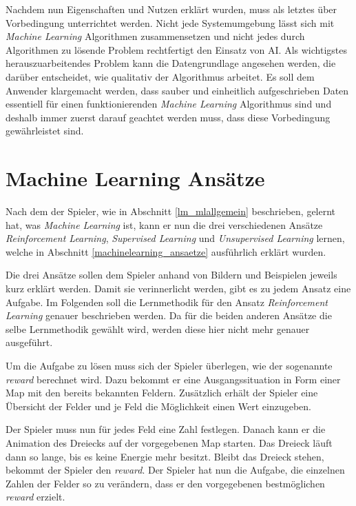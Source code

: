 Nachdem nun Eigenschaften und Nutzen erklärt wurden, muss als letztes über Vorbedingung unterrichtet werden. Nicht jede Systemumgebung lässt sich mit \textit{Machine Learning} Algorithmen zusammensetzen und nicht jedes durch Algorithmen zu lösende Problem rechtfertigt den Einsatz von AI. Als wichtigstes herauszuarbeitendes Problem kann die Datengrundlage angesehen werden, die darüber entscheidet, wie qualitativ der Algorithmus arbeitet. Es soll dem Anwender klargemacht werden, dass sauber und einheitlich aufgeschrieben Daten essentiell für einen funktionierenden \textit{Machine Learning} Algorithmus sind und deshalb immer zuerst darauf geachtet werden muss, dass diese Vorbedingung gewährleistet sind.

\section{Machine Learning Ansätze}
\label{lm_mlansaetze}
Nach dem der Spieler, wie in Abschnitt \ref{lm_mlallgemein} beschrieben, gelernt hat, was \textit{Machine Learning} ist, kann er nun die drei verschiedenen Ansätze \textit{Reinforcement Learning}, \textit{Supervised Learning} und \textit{Unsupervised Learning} lernen, welche in Abschnitt \ref{machinelearning_ansaetze} ausführlich erklärt wurden.  

Die drei Ansätze sollen dem Spieler anhand von Bildern und Beispielen jeweils kurz erklärt werden. Damit sie verinnerlicht werden, gibt es zu jedem Ansatz eine Aufgabe. Im Folgenden soll die Lernmethodik für den Ansatz \textit{Reinforcement Learning} genauer beschrieben werden. Da für die beiden anderen Ansätze  die selbe Lernmethodik gewählt wird, werden diese hier nicht mehr genauer ausgeführt.

Um die Aufgabe zu lösen muss sich der Spieler überlegen, wie der sogenannte \textit{reward} berechnet wird. Dazu bekommt er eine Ausgangssituation in Form einer Map mit den bereits bekannten Feldern. Zusätzlich erhält der Spieler eine Übersicht der Felder und je Feld die Möglichkeit einen Wert einzugeben. 

Der Spieler muss nun für jedes Feld eine Zahl festlegen. Danach kann er die Animation des Dreiecks auf der vorgegebenen Map starten. Das Dreieck läuft dann so lange, bis es keine Energie mehr besitzt. Bleibt das Dreieck stehen, bekommt der Spieler den \textit{reward}.
Der Spieler hat nun die Aufgabe, die einzelnen Zahlen der Felder so zu verändern, dass er den vorgegebenen bestmöglichen \textit{reward} erzielt. 

